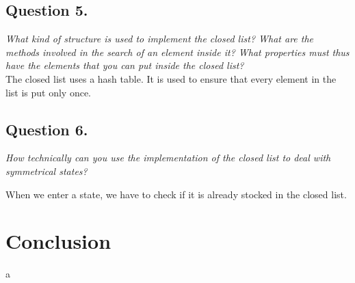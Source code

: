 \documentclass[a4paper, 12pt]{article}
\begin{document}
\subsection{Question 5.}
\textit{What kind of structure is used to implement the closed list? What are the methods involved in the search of an element inside it? What properties must thus have the elements that you can put inside the closed list?}\\
The closed list uses a hash table. It is used to ensure that every element in the list is put only once. 

\subsection{Question 6.}
\textit{How technically can you use the implementation of the closed list to deal with symmetrical states?}

When we enter a state, we have to check if it is already stocked in the closed list.
\section{Conclusion}
a
\end{document}
